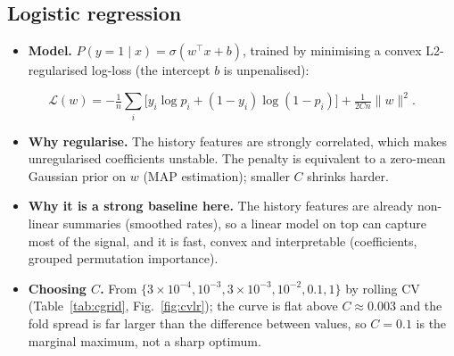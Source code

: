 \documentclass[conference]{IEEEtran}
\begin{document}
\subsection{Logistic regression}
\begin{itemize}
\item \textbf{Model.} $P(y=1\mid x)=\sigma(w^\top x+b)$, trained by minimising a convex L2-regularised log-loss (the intercept $b$ is unpenalised):
\end{itemize}
\[
\mathcal{L}(w)=-\tfrac1n\textstyle\sum_i\big[y_i\log p_i+(1-y_i)\log(1-p_i)\big]+\tfrac{1}{2Cn}\lVert w\rVert^2 .
\]
\begin{itemize}
\item \textbf{Why regularise.} The history features are strongly correlated, which makes unregularised coefficients unstable. The penalty is equivalent to a zero-mean Gaussian prior on $w$ (MAP estimation); smaller $C$ shrinks harder.
\item \textbf{Why it is a strong baseline here.} The history features are already non-linear summaries (smoothed rates), so a linear model on top can capture most of the signal, and it is fast, convex and interpretable (coefficients, grouped permutation importance).
\item \textbf{Choosing $C$.} From $\{3\!\times\!10^{-4},10^{-3},3\!\times\!10^{-3},10^{-2},0.1,1\}$ by rolling CV (Table~\ref{tab:cgrid}, Fig.~\ref{fig:cvlr}); the curve is flat above $C\approx0.003$ and the fold spread is far larger than the difference between values, so $C=0.1$ is the marginal maximum, not a sharp optimum.
\end{itemize}
\end{document}

